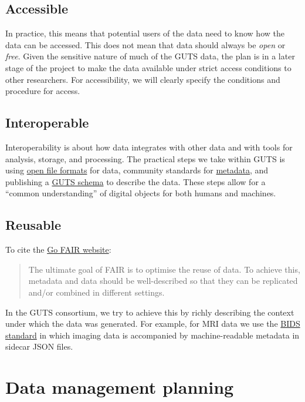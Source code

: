 \documentclass[
  letterpaper,
  DIV=11,
  numbers=noendperiod]{scrreprt}
\begin{document}
\section{Accessible}\label{accessible}

In practice, this means that potential users of the data need to know
how the data can be accessed. This does not mean that data should always
be \emph{open} or \emph{free}. Given the sensitive nature of much of the
GUTS data, the plan is in a later stage of the project to make the data
available under strict access conditions to other researchers. For
accessibility, we will clearly specify the conditions and procedure for
access.

\section{Interoperable}\label{interoperable}

Interoperability is about how data integrates with other data and with
tools for analysis, storage, and processing. The practical steps we take
within GUTS is using \href{data-formats.qmd}{open file formats} for
data, community standards for \href{metadata.qmd}{metadata}, and
publishing a \href{https://guts-consortium.github.io/schema/}{GUTS
schema} to describe the data. These steps allow for a ``common
understanding'' of digital objects for both humans and machines.

\section{Reusable}\label{reusable}

To cite the \href{https://www.go-fair.org/fair-principles/}{Go FAIR
website}:

\begin{quote}
The ultimate goal of FAIR is to optimise the reuse of data. To achieve
this, metadata and data should be well-described so that they can be
replicated and/or combined in different settings.
\end{quote}

In the GUTS consortium, we try to achieve this by richly describing the
context under which the data was generated. For example, for MRI data we
use the \href{https://bids.neuroimaging.io/}{BIDS standard} in which
imaging data is accompanied by machine-readable metadata in sidecar JSON
files.

\chapter{Data management planning}\label{data-management-planning}
\end{document}
